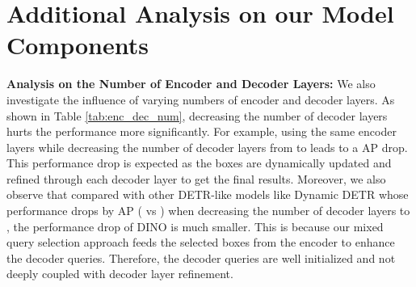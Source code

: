 \documentclass[runningheads]{llncs}
\begin{document}
 \section{Additional Analysis on our Model Components}\label{sec:num_layer}
\begin{table}[h]
\centering
    \centering
    \vspace{0.3cm}
    \caption{Ablation on the numbers of encoder layers and decoder layers with the ResNet-50 backbone on COCO \texttt{val2017}. We use the -epoch setting and  DN queries without negative samples here.
    }
    \label{tab:enc_dec_num}
\end{table} \noindent
\textbf{Analysis on the Number of Encoder and Decoder Layers: }We also investigate the influence of varying numbers of encoder and decoder layers. As shown in Table \ref{tab:enc_dec_num}, decreasing the number of decoder layers hurts the performance more significantly. For example, using the same  encoder layers while decreasing the number of decoder layers from  to  leads to a  AP drop. This performance drop is expected as the boxes are dynamically updated and refined through each decoder layer to get the final results. Moreover, we also observe that compared with other DETR-like models like Dynamic DETR \cite{dai2021dynamic} whose performance drops by AP ( vs ) when decreasing the number of decoder layers to , the performance drop of DINO is much smaller. This is because our mixed query selection approach feeds the selected boxes from the encoder to enhance the decoder queries. Therefore, the decoder queries are well initialized and not deeply coupled with decoder layer refinement. 
\begin{table}[h]
\centering
    \centering
    \vspace{0.3cm}
    \caption{Ablation on number of denoising queries with the ResNet-50 backbone on COCO validation. Note that  CND query pairs contains  queries which are  positive and  negative queries.
    }
    \label{tab:dn_num}
\end{table} \\
\end{document}
